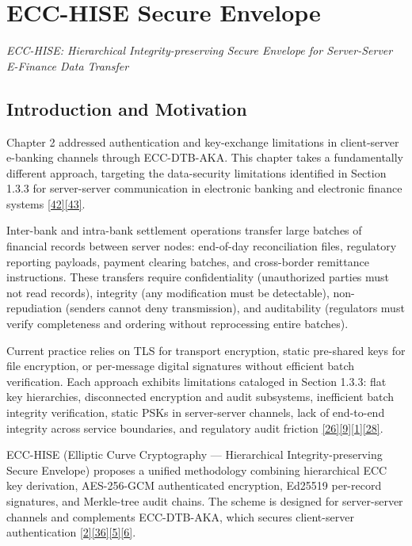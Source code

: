 \chapter{ECC-HISE Secure Envelope}
\label{ch:chapter03}

\noindent\textit{ECC-HISE: Hierarchical Integrity-preserving Secure Envelope for Server-Server E-Finance Data Transfer}\par\vspace{1em}

\section{Introduction and Motivation}

\indent Chapter 2 addressed authentication and key-exchange limitations in client-server e-banking channels through ECC-DTB-AKA. This chapter takes a fundamentally different approach, targeting the data-security limitations identified in Section 1.3.3 for server-server communication in electronic banking and electronic finance systems \hyperref[ref:42]{[42]}\hyperref[ref:43]{[43]}.

\indent Inter-bank and intra-bank settlement operations transfer large batches of financial records between server nodes: end-of-day reconciliation files, regulatory reporting payloads, payment clearing batches, and cross-border remittance instructions. These transfers require confidentiality (unauthorized parties must not read records), integrity (any modification must be detectable), non-repudiation (senders cannot deny transmission), and auditability (regulators must verify completeness and ordering without reprocessing entire batches).

\indent Current practice relies on TLS for transport encryption, static pre-shared keys for file encryption, or per-message digital signatures without efficient batch verification. Each approach exhibits limitations cataloged in Section 1.3.3: flat key hierarchies, disconnected encryption and audit subsystems, inefficient batch integrity verification, static PSKs in server-server channels, lack of end-to-end integrity across service boundaries, and regulatory audit friction \hyperref[ref:26]{[26]}\hyperref[ref:9]{[9]}\hyperref[ref:1]{[1]}\hyperref[ref:28]{[28]}.

\indent ECC-HISE (Elliptic Curve Cryptography --- Hierarchical Integrity-preserving Secure Envelope) proposes a unified methodology combining hierarchical ECC key derivation, AES-256-GCM authenticated encryption, Ed25519 per-record signatures, and Merkle-tree audit chains. The scheme is designed for server-server channels and complements ECC-DTB-AKA, which secures client-server authentication \hyperref[ref:2]{[2]}\hyperref[ref:36]{[36]}\hyperref[ref:5]{[5]}\hyperref[ref:6]{[6]}.

